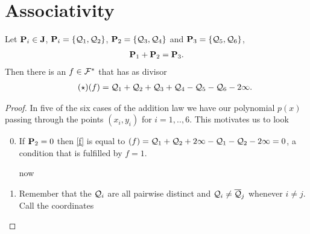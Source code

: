 \documentclass[english,11pt,a4paper]{article}
\begin{document}
\section{Associativity}

\begin{theorem}
  Let $\P_i \in \J$, $\P_i = \{ \q_1, \q_2 \}$, $\P_2 = \{ \q_3, \q_4 \}$ and $\P_3 = \{ \q_5, \q_6 \}$,
  \begin{align*}
    \P_1 + \P_2 = \P_3.
  \end{align*}
  Then there is an $f \in \F^*$ that has as divisor
  \begin{align*}\label{f}\tag{$\star$}
    (f) = \q_1 + \q_2 + \q_3 + \q_4 - \q_5 - \q_6 - 2 \infty.
  \end{align*}
  \begin{proof} In five of the six cases of the addition law we have our polynomial $p(x)$ passing through the points $(x_i, y_i)$ for $i = 1,..,6$. This motivates us to look 

    \begin{enumerate}[1.]\setcounter{enumi}{-1}
      \item If $\P_2 = 0$ then \eqref{f} is equal to $(f) = \q_1 + \q_2 + 2 \infty - \q_1 - \q_2 - 2 \infty = 0$, a condition that is fulfilled by $f = 1$.

      now

      \item Remember that the $\q_i$ are all pairwise distinct and $\q_i \neq \bar \q_j$ whenever $i \neq j$. Call the coordinates 
    \end{enumerate}
  \end{proof}
\end{theorem}
\end{document}
